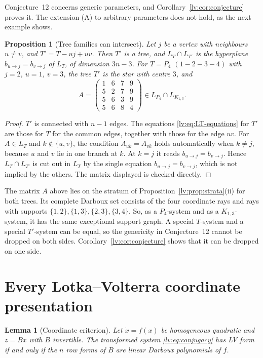 \documentclass[11pt,a4paper]{article}
\newtheorem{lemma}[theorem]{Lemma}
\newtheorem{proposition}[theorem]{Proposition}
\theoremstyle{definition}
\theoremstyle{remark}
\begin{document}
Conjecture~12 concerns generic parameters, and Corollary~\ref{lv:cor:conjecture} proves it. The extension (A) to arbitrary parameters does not hold, as the next example shows.

\begin{proposition}[Tree families can intersect]
\label{lv:prop:intersection}
Let $j$ be a vertex with neighbours $u\neq v$, and $T'=T-uj+uv$. Then $T'$ is a tree, and $L_T\cap L_{T'}$ is the hyperplane $b_{u\to j}=b_{v\to j}$ of $L_T$, of dimension $3n-3$. For $T=P_4$ $(1-2-3-4)$ with $j=2$, $u=1$, $v=3$, the tree $T'$ is the star with centre $3$, and
\[
 A=\begin{pmatrix}1&6&7&9\\5&2&7&9\\5&6&3&9\\5&6&8&4\end{pmatrix}\in L_{P_4}\cap L_{K_{1,3}}.
\]
\end{proposition}

\begin{proof}
$T'$ is connected with $n-1$ edges. The equations \eqref{lv:eq:LT-equations} for $T'$ are those for $T$ for the common edges, together with those for the edge $uv$. For $A\in L_T$ and $k\notin\{u,v\}$, the condition $A_{uk}=A_{vk}$ holds automatically when $k\neq j$, because $u$ and $v$ lie in one branch at $k$. At $k=j$ it reads $b_{u\to j}=b_{v\to j}$. Hence $L_T\cap L_{T'}$ is cut out in $L_T$ by the single equation $b_{u\to j}=b_{v\to j}$, which is not implied by the others. The matrix displayed is checked directly.
\end{proof}

The matrix $A$ above lies on the stratum of Proposition~\ref{lv:prop:strata}(ii) for both trees. Its complete Darboux set consists of the four coordinate rays and rays with supports $\{1,2\},\{1,3\},\{2,3\},\{3,4\}$. So, as a $P_4$-system and as a $K_{1,3}$-system, it has the same exceptional support graph. A special $T$-system and a special $T'$-system can be equal, so the genericity in Conjecture~12 cannot be dropped on both sides. Corollary~\ref{lv:cor:conjecture} shows that it can be dropped on one side.

\section{Every Lotka--Volterra coordinate presentation}
\label{lv:sec:coordinates}

\begin{lemma}[Coordinate criterion]
\label{lv:lem:coordinate-criterion}
Let $\dot x=f(x)$ be homogeneous quadratic and $z=Bx$ with $B$ invertible. The transformed system \eqref{lv:eq:conjugacy} has LV form if and only if the $n$ row forms of $B$ are linear Darboux polynomials of $f$.
\end{lemma}
\end{document}
